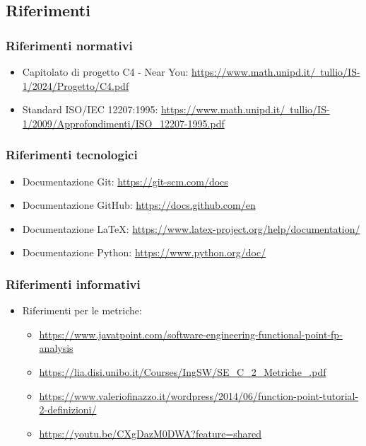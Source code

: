 \documentclass[10pt]{article}
\begin{document}
\begin{justify}
    \subsection{Riferimenti}
        \subsubsection{Riferimenti normativi}
        \begin{itemize}
            \item Capitolato di progetto C4 - Near You: \href{https://www.math.unipd.it/~tullio/IS-1/2024/Progetto/C4.pdf}{https://www.math.unipd.it/~tullio/IS-1/2024/Progetto/C4.pdf}
            \item Standard ISO/IEC 12207:1995: \href{https://www.math.unipd.it/~tullio/IS-1/2009/Approfondimenti/ISO_12207-1995.pdf}{https://www.math.unipd.it/~tullio/IS-1/2009/Approfondimenti/ISO\_12207-1995.pdf}
        \end{itemize}
        \subsubsection{Riferimenti tecnologici}
        \begin{itemize}
            \item Documentazione Git: \href{https://git-scm.com/docs}{https://git-scm.com/docs}
            \item Documentazione GitHub: \href{https://docs.github.com/en}{https://docs.github.com/en}
            \item Documentazione \LaTeX: \href{https://www.latex-project.org/help/documentation/}{https://www.latex-project.org/help/documentation/}
            \item Documentazione Python: \href{https://www.python.org/doc/}{https://www.python.org/doc/}
        \end{itemize}
        \subsubsection{Riferimenti informativi}
        \begin{itemize}
            \item Riferimenti per le metriche: 
            \begin{itemize}
                \item \href{https://www.javatpoint.com/software-engineering-functional-point-fp-analysis}{https://www.javatpoint.com/software-engineering-functional-point-fp-analysis}
                \item \url{https://lia.disi.unibo.it/Courses/IngSW/SE_C_2_Metriche_.pdf}
                \item \href{https://www.valeriofinazzo.it/wordpress/2014/06/function-point-tutorial-2-definizioni/}{https://www.valeriofinazzo.it/wordpress/2014/06/function-point-tutorial-2-definizioni/}
                \item \href{https://youtu.be/CXgDazM0DWA?feature=shared}{https://youtu.be/CXgDazM0DWA?feature=shared}
            \end{itemize}
        \end{itemize}


\end{justify}
\end{document}
